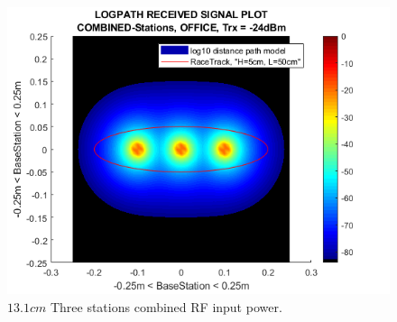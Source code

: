 \begin{figure}[h]
	\centering
	\includegraphics[width=\linewidth]{theory/pathLoss/fig/logpathReceivedSignal_combinedStations_office_lowSignal.png}
	\caption{$13.1cm$ Three stations combined RF input power.}
	\label{fig:logpathReceivedSignal_combinedStations_office_lowSignal}
\end{figure}